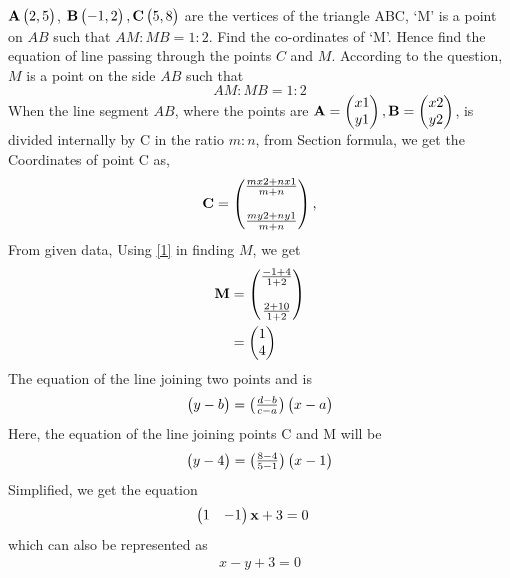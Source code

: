 \documentclass[journal,12pt,twocolumn]{IEEEtran}
\begin{document}
\question $\mathbf{A}\begin{pmatrix}2,5\end{pmatrix}$, $\mathbf{B}\begin{pmatrix}-1,2\end{pmatrix}, \mathbf{C}\begin{pmatrix}5,8\end{pmatrix}$ are the vertices of the triangle ABC, `M' is a point on $AB$ such that $AM:MB = 1:2$. Find the co-ordinates of `M'. Hence find the equation of line passing through the points $C$ and $M$.
\newline \newline
\solution According to the question, $M$ is a point on the side $AB$ such that $$AM : MB = 1 : 2$$
 When the line segment $AB$, where the points are $\mathbf{A}=\begin{pmatrix}x1\\y1\end{pmatrix}, \mathbf{B}=\begin{pmatrix}x2\\y2\end{pmatrix}$, is divided internally by C in the ratio $m:n$, from Section formula,
 we get the Coordinates of point C as,
\begin{align} 
\mathbf{C} = \begin{pmatrix}\frac{mx2+nx1}{m+n}\\\\ \frac{my2+ny1}{m+n}\end{pmatrix},\label{1}
\end{align}
From given data, Using \eqref{1} in finding $M$, we get
\begin{align}
    \mathbf{M} &= \begin{pmatrix}\frac{-1+4}{1+2}\\\\ \frac{2+10}{1+2}\end{pmatrix}\\  \label{3}
   &= \begin{pmatrix}1\\4\end{pmatrix}
\end{align}\newline
The equation of the line joining two points  and  is 
\begin{align}
    \begin{pmatrix}y-b\end{pmatrix} = {\begin{pmatrix}\frac{d-b}{c-a}\end{pmatrix}}\begin{pmatrix}x-a\end{pmatrix} \label{5}
\end{align}
Here, the equation of the line joining points C and M will be
\begin{align}
    \begin{pmatrix}y-4\end{pmatrix} = \begin{pmatrix}\frac{8-4}{5-1}\end{pmatrix}\begin{pmatrix}x-1\end{pmatrix} \label{6}
\end{align}
Simplified, we get the equation
\begin{align}
    \begin{pmatrix}1 & - 1\end{pmatrix}\mathbf{x} + 3 &=0 
\end{align}
 which can also be represented as 
 \begin{align}
     x-y+3=0
 \end{align}
\end{document}
